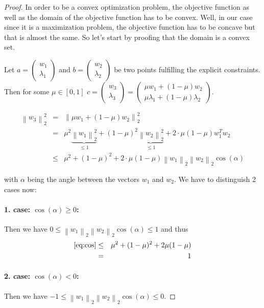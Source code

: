 \documentclass[a4paper, 11pt, titlepage]{article}
\newcommand{\norm}[1]{\left\lVert#1\right\rVert}
\begin{document}
\begin{proof}
	In order to be a convex optimization problem, the objective function as well as the domain of the objective function has to be convex.
	Well, in our case since it is a maximization problem, the objective function has to be concave but that is almost the same.
	So let's start by proofing that the domain is a convex set.
	
	Let $a = \begin{pmatrix}
	w_1\\
	\lambda_1
	\end{pmatrix}$ and $b =  \begin{pmatrix}
	w_2\\
	\lambda_2
	\end{pmatrix}$ be two points fulfilling the explicit constraints.
	Then for some $\mu\in[0,1]$ $c = \begin{pmatrix} 
		w_3\\
		\lambda_3
	\end{pmatrix} = \begin{pmatrix}
		\mu w_1 + (1-\mu) w_2\\
		\mu \lambda_1 + (1-\mu) \lambda_2
	\end{pmatrix}$.
	
	\begin{eqnarray}
		\norm{w_3}_2^2 &=& \norm{\mu w_1 + (1-\mu) w_2}_2^2 \nonumber \\
		&=& \mu^2\underbrace{\norm{w_1}_2^2}_{\le 1} + (1-\mu)^2\underbrace{\norm{w_2}_2^2}_{\le 1} + 2\cdot \mu(1-\mu) w_1^Tw_2\nonumber\\
		&\le& \mu^2 +(1-\mu)^2 +2\cdot \mu(1-\mu)\norm{w_1}_2\norm{w_2}_2 \cos(\alpha)\label{eq:cos}
	\end{eqnarray}
	
	with $\alpha$ being the angle between the vectors $w_1$ and $w_2$.
	We have to distinguish 2 cases now:
	
	\paragraph{1. case: $\cos(\alpha) \ge 0$:}
	Then we have $0 \le \norm{w_1}_2\norm{w_2}_2 \cos(\alpha) \le 1$ and thus
	\begin{eqnarray*}
		\eqref{eq:cos} &\le& \mu^2+ (1-\mu)^2 +2\mu(1-\mu)\\
		&=& 1
	\end{eqnarray*}
	
	\paragraph{2. case: $\cos(\alpha) < 0$:}
	Then we have $-1 \le \norm{w_1}_2\norm{w_2}_2 \cos(\alpha) \le 0$.
	

\end{proof}
\end{document}
